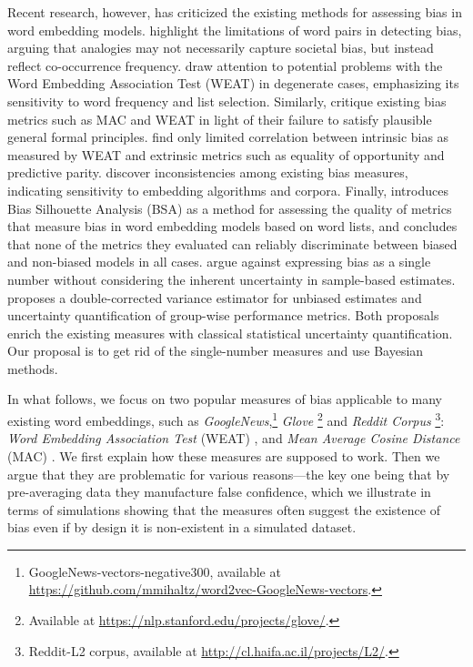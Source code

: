 \documentclass{clv3}
\begin{document}
Recent research, however, has criticized the existing methods for assessing bias in word embedding models. \citet{zhang2020robustness} highlight the limitations of word pairs in detecting bias, arguing that analogies may not necessarily capture societal bias, but instead reflect co-occurrence frequency. \citet{Ethayarajh2019understanding} draw attention to potential problems with the Word Embedding Association Test (WEAT) in degenerate cases, emphasizing its sensitivity to word frequency and list selection. Similarly, \citet{schroder2021evaluating} critique existing bias metrics such as \textsf{MAC} and \textsf{WEAT} in light of their failure to satisfy plausible general formal principles.  \citet{Goldfarb2021BiasNotCorrelate} find only limited correlation between intrinsic bias as measured by WEAT and extrinsic metrics such as equality of opportunity and predictive parity. \citet{Du2021Assessing} discover inconsistencies among existing bias measures, indicating sensitivity to embedding algorithms and corpora. Finally, \citet{Spliethover2021BiasSilhouette} introduces Bias Silhouette Analysis (BSA) as a method for assessing the quality of metrics that measure bias in word embedding models based on word lists, and concludes that none of the metrics they evaluated can reliably discriminate between biased and non-biased models in all cases.  \citet{Ethayarajh2020Bernstein} argue against expressing bias as a single number without considering the inherent uncertainty in sample-based estimates. \citet{Lum2022Debiasing} proposes a double-corrected variance estimator for unbiased estimates and uncertainty quantification of group-wise performance metrics. Both proposals enrich the existing measures with classical statistical uncertainty quantification. Our proposal is to get rid of the single-number measures and use Bayesian methods.






In what follows, we focus on two popular measures of bias applicable to
many existing word embeddings, such as
\emph{GoogleNews},\footnote{GoogleNews-vectors-negative300, available at  \url{https://github.com/mmihaltz/word2vec-GoogleNews-vectors}.}
\emph{Glove} \citep{Pennington2014Glove}\footnote{Available at \url{https://nlp.stanford.edu/projects/glove/}.}
and
\emph{Reddit Corpus} \citep{Rabinovich2018Reddit}\footnote{Reddit-L2 corpus, available at  \url{http://cl.haifa.ac.il/projects/L2/}.}:
\emph{Word Embedding Association Test} (\textsf{WEAT}) \citep{Caliskan2017semanticsBiases}, and
\emph{Mean Average Cosine Distance} (\textsf{MAC}) \citep{Manzini2019blackToCriminal}.  We first
explain how these measures are supposed to work. Then we argue that they
are problematic for various reasons---the key one being that by
pre-averaging data they manufacture false confidence, which we
illustrate in terms of simulations showing that the measures often
suggest the existence of bias even if by design it is non-existent in a
simulated dataset.
\end{document}
